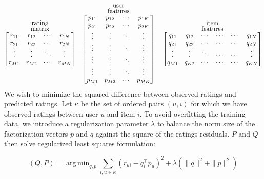 \documentclass{article} %
\DeclareMathOperator*{\argmin}{arg\,min}
\begin{document}
\[
  \stackrel{\stackrel{\mbox{rating}}{\mbox{matrix}}}{%
    \begin{bmatrix}
    r_{11} & r_{12} & \cdots & r_{1N} \\
    r_{21} & r_{22} & \cdots & r_{2N} \\
    \vdots & \vdots & \ddots & \vdots \\
    r_{M1} & r_{M2} & \cdots & r_{MN}
    \end{bmatrix}%
  }\ = 
  \stackrel{\stackrel{\mbox{user}}{\mbox{features}}}{%
    \begin{bmatrix}
    p_{11} & p_{12} & \cdots & p_{1K} \\
    p_{21} & p_{22} & \cdots & p_{2K} \\
    \vdots & \vdots & \ddots & \vdots \\
    \vdots & \vdots & \ddots & \vdots \\
    \vdots & \vdots & \ddots & \vdots \\
    \vdots & \vdots & \ddots & \vdots \\
    p_{M1} & p_{M2} & \cdots & p_{MK}
    \end{bmatrix}%
  }\ \quad
  \stackrel{\stackrel{\mbox{item}}{\mbox{features}}}{%
    \begin{bmatrix}
    q_{11} & q_{12} & \cdots & \cdots & \cdots & q_{1N} \\
    q_{21} & q_{22} & \cdots & \cdots & \cdots & q_{2N} \\
    \vdots & \vdots & \ddots & \cdots & \cdots & \vdots \\
    q_{M1} & q_{K2} & \cdots & \cdots & \cdots & q_{KN}
    \end{bmatrix}%
   }
\]
We wish to minimize the squared difference between observed ratings and predicted ratings. Let $\kappa$ be the set of ordered pairs $(u,i)$ for which we have observed ratings between user $u$ and item $i$. To avoid overfitting the training data, we introduce a regularization parameter $\lambda$ to balance the norm size of the factorization vectors $p$ and $q$ against the square of the ratings residuals. $P$ and $Q$ then solve regularized least squares formulation:

\begin{equation}
    (Q, P) = \argmin_{q, p} \sum_{i,u \in \kappa} (r_{ui}-q_i^\intercal p_u)^2 + \lambda( \|q\|^2 + \|p\|^2)
\end{equation}
\end{document}
